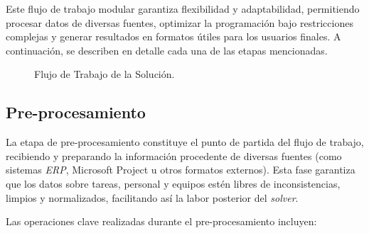 \documentclass{article}
\begin{document}
Este flujo de trabajo modular garantiza flexibilidad y adaptabilidad, permitiendo procesar datos de diversas fuentes, optimizar la programación bajo restricciones complejas y generar resultados en formatos útiles para los usuarios finales. A continuación, se describen en detalle cada una de las etapas mencionadas.


\begin{figure}[htbp]
    \centering
    \caption{Flujo de Trabajo de la Solución.}
    \label{fig:solution}
\end{figure}

\subsection{Pre-procesamiento}

La etapa de pre-procesamiento constituye el punto de partida del flujo de trabajo, recibiendo y preparando la información procedente de diversas fuentes (como sistemas \textit{ERP}, Microsoft Project u otros formatos externos). Esta fase garantiza que los datos sobre tareas, personal y equipos estén libres de inconsistencias, limpios y normalizados, facilitando así la labor posterior del \textit{solver}.

Las operaciones clave realizadas durante el pre-procesamiento incluyen:
\end{document}
